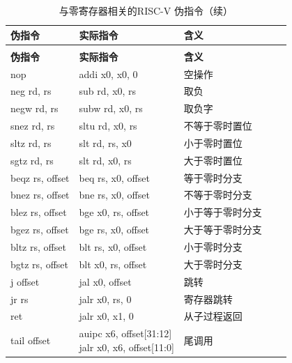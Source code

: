 \begin{longtable}{>{\centering\arraybackslash}p{5cm} >{\centering\arraybackslash}p{5.2cm} >{\centering\arraybackslash}p{5cm}}
	\caption{与零寄存器相关的RISC-V 伪指令}                                      \\
	\toprule
	\textbf{伪指令}    & \textbf{实际指令}                     & \textbf{含义} \\
	\midrule
	\endhead
	\caption{与零寄存器相关的RISC-V 伪指令（续）}                                   \\
	\toprule
	\textbf{伪指令}    & \textbf{实际指令}                     & \textbf{含义} \\
	\midrule
	\endhead
	\midrule
	\multicolumn{3}{r}{\textit{续下页}}
	\endfoot
	\bottomrule
	\endlastfoot
	nop             & addi x0, x0, 0                    & 空操作         \\
	neg rd, rs      & sub rd, x0, rs                    & 取负          \\
	negw rd, rs     & subw rd, x0, rs                   & 取负字         \\
	\midrule
	snez rd, rs     & sltu rd, x0, rs                   & 不等于零时置位     \\
	sltz rd, rs     & slt rd, rs, x0                    & 小于零时置位      \\
	sgtz rd, rs     & slt rd, x0, rs                    & 大于零时置位      \\
	\midrule
	beqz rs, offset & beq rs, x0, offset                & 等于零时分支      \\
	bnez rs, offset & bne rs, x0, offset                & 不等于零时分支     \\
	blez rs, offset & bge x0, rs, offset                & 小于等于零时分支    \\
	bgez rs, offset & bge rs, x0, offset                & 大于等于零时分支    \\
	bltz rs, offset & blt rs, x0, offset                & 小于零时分支      \\
	bgtz rs, offset & blt x0, rs, offset                & 大于零时分支      \\
	\midrule
	j offset        & jal x0, offset                    & 跳转          \\
	jr rs           & jalr x0, rs, 0                    & 寄存器跳转       \\
	ret             & jalr x0, x1, 0                    & 从子过程返回      \\
	\midrule
	tail offset     & \makecell{auipc x6, offset[31:12]               \\ jalr x0, x6, offset[11:0]} & 尾调用 \\

\end{longtable}

